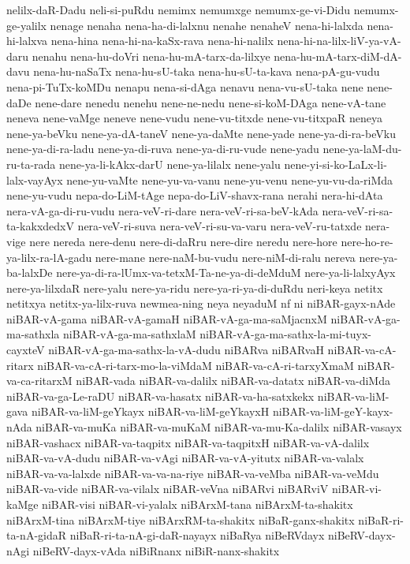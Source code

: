 {nelilx-daR-Dadu
neli-si-puRdu
nemimx
nemumxge
nemumx-ge-vi-Didu
nemumx-ge-yalilx
nenage
nenaha
nena-ha-di-lalxnu
nenahe
nenaheV
nena-hi-lalxda
nena-hi-lalxva
nena-hina
nena-hi-na-kaSx-rava
nena-hi-nalilx
nena-hi-na-lilx-liV-ya-vA-daru
nenahu
nena-hu-doVri
nena-hu-mA-tarx-da-lilxye
nena-hu-mA-tarx-diM-dA-davu
nena-hu-naSaTx
nena-hu-sU-taka
nena-hu-sU-ta-kava
nena-pA-gu-vudu
nena-pi-TuTx-koMDu
nenapu
nena-si-dAga
nenavu
nena-vu-sU-taka
nene
nene-daDe
nene-dare
nenedu
nenehu
nene-ne-nedu
nene-si-koM-DAga
nene-vA-tane
neneva
nene-vaMge
neneve
nene-vudu
nene-vu-titxde
nene-vu-titxpaR
neneya
nene-ya-beVku
nene-ya-dA-taneV
nene-ya-daMte
nene-yade
nene-ya-di-ra-beVku
nene-ya-di-ra-ladu
nene-ya-di-ruva
nene-ya-di-ru-vude
nene-yadu
nene-ya-laM-du-ru-ta-rada
nene-ya-li-kAkx-darU
nene-ya-lilalx
nene-yalu
nene-yi-si-ko-LaLx-li-lalx-vayAyx
nene-yu-vaMte
nene-yu-va-vanu
nene-yu-venu
nene-yu-vu-da-riMda
nene-yu-vudu
nepa-do-LiM-tAge
nepa-do-LiV-shavx-rana
nerahi
nera-hi-dAta
nera-vA-ga-di-ru-vudu
nera-veV-ri-dare
nera-veV-ri-sa-beV-kAda
nera-veV-ri-sa-ta-kakxdedxV
nera-veV-ri-suva
nera-veV-ri-su-va-varu
nera-veV-ru-tatxde
nera-vige
nere
nereda
nere-denu
nere-di-daRru
nere-dire
neredu
nere-hore
nere-ho-re-ya-lilx-ra-lA-gadu
nere-mane
nere-naM-bu-vudu
nere-niM-di-ralu
nereva
nere-ya-ba-lalxDe
nere-ya-di-ra-lUmx-va-tetxM-Ta-ne-ya-di-deMduM
nere-ya-li-lalxyAyx
nere-ya-lilxdaR
nere-yalu
nere-ya-ridu
nere-ya-ri-ya-di-duRdu
neri-keya
netitx
netitxya
netitx-ya-lilx-ruva
newmea-ning
neya
neyaduM
nf
ni
niBAR-gayx-nAde
niBAR-vA-gama
niBAR-vA-gamaH
niBAR-vA-ga-ma-saMjacnxM
niBAR-vA-ga-ma-sathxla
niBAR-vA-ga-ma-sathxlaM
niBAR-vA-ga-ma-sathx-la-mi-tuyx-cayxteV
niBAR-vA-ga-ma-sathx-la-vA-dudu
niBARva
niBARvaH
niBAR-va-cA-ritarx
niBAR-va-cA-ri-tarx-mo-la-viMdaM
niBAR-va-cA-ri-tarxyXmaM
niBAR-va-ca-ritarxM
niBAR-vada
niBAR-va-dalilx
niBAR-va-datatx
niBAR-va-diMda
niBAR-va-ga-Le-raDU
niBAR-va-hasatx
niBAR-va-ha-satxkekx
niBAR-va-liM-gava
niBAR-va-liM-geYkayx
niBAR-va-liM-geYkayxH
niBAR-va-liM-geY-kayx-nAda
niBAR-va-muKa
niBAR-va-muKaM
niBAR-va-mu-Ka-dalilx
niBAR-vasayx
niBAR-vashacx
niBAR-va-taqpitx
niBAR-va-taqpitxH
niBAR-va-vA-dalilx
niBAR-va-vA-dudu
niBAR-va-vAgi
niBAR-va-vA-yitutx
niBAR-va-valalx
niBAR-va-va-lalxde
niBAR-va-va-na-riye
niBAR-va-veMba
niBAR-va-veMdu
niBAR-va-vide
niBAR-va-vilalx
niBAR-veVna
niBARvi
niBARviV
niBAR-vi-kaMge
niBAR-visi
niBAR-vi-yalalx
niBArxM-tana
niBArxM-ta-shakitx
niBArxM-tina
niBArxM-tiye
niBArxRM-ta-shakitx
niBaR-ganx-shakitx
niBaR-ri-ta-nA-gidaR
niBaR-ri-ta-nA-gi-daR-nayayx
niBaRya
niBeRVdayx
niBeRV-dayx-nAgi
niBeRV-dayx-vAda
niBiRnanx
niBiR-nanx-shakitx
}
